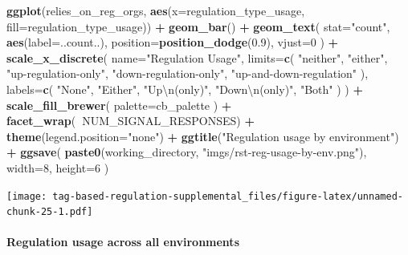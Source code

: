 \documentclass[]{book}
\newenvironment{Shaded}{\begin{snugshade}}{\end{snugshade}}
\newcommand{\CharTok}[1]{\textcolor[rgb]{0.31,0.60,0.02}{#1}}
\newcommand{\DataTypeTok}[1]{\textcolor[rgb]{0.13,0.29,0.53}{#1}}
\newcommand{\DecValTok}[1]{\textcolor[rgb]{0.00,0.00,0.81}{#1}}
\newcommand{\FloatTok}[1]{\textcolor[rgb]{0.00,0.00,0.81}{#1}}
\newcommand{\KeywordTok}[1]{\textcolor[rgb]{0.13,0.29,0.53}{\textbf{#1}}}
\newcommand{\NormalTok}[1]{#1}
\newcommand{\OperatorTok}[1]{\textcolor[rgb]{0.81,0.36,0.00}{\textbf{#1}}}
\newcommand{\StringTok}[1]{\textcolor[rgb]{0.31,0.60,0.02}{#1}}
\let\oldparagraph\paragraph
\renewcommand{\paragraph}[1]{\oldparagraph{#1}\mbox{}}
\begin{document}
\begin{Shaded}
\begin{Highlighting}[]
\KeywordTok{ggplot}\NormalTok{(relies_on_reg_orgs, }\KeywordTok{aes}\NormalTok{(}\DataTypeTok{x=}\NormalTok{regulation_type_usage, }\DataTypeTok{fill=}\NormalTok{regulation_type_usage)) }\OperatorTok{+}
\StringTok{  }\KeywordTok{geom_bar}\NormalTok{() }\OperatorTok{+}
\StringTok{  }\KeywordTok{geom_text}\NormalTok{(}
    \DataTypeTok{stat=}\StringTok{"count"}\NormalTok{,}
    \KeywordTok{aes}\NormalTok{(}\DataTypeTok{label=}\NormalTok{..count..),}
    \DataTypeTok{position=}\KeywordTok{position_dodge}\NormalTok{(}\FloatTok{0.9}\NormalTok{),}
    \DataTypeTok{vjust=}\DecValTok{0}
\NormalTok{  ) }\OperatorTok{+}
\StringTok{  }\KeywordTok{scale_x_discrete}\NormalTok{(}
    \DataTypeTok{name=}\StringTok{"Regulation Usage"}\NormalTok{,}
    \DataTypeTok{limits=}\KeywordTok{c}\NormalTok{(}
      \StringTok{"neither"}\NormalTok{,}
      \StringTok{"either"}\NormalTok{,}
      \StringTok{"up-regulation-only"}\NormalTok{,}
      \StringTok{"down-regulation-only"}\NormalTok{,}
      \StringTok{"up-and-down-regulation"}
\NormalTok{    ),}
    \DataTypeTok{labels=}\KeywordTok{c}\NormalTok{(}
      \StringTok{"None"}\NormalTok{,}
      \StringTok{"Either"}\NormalTok{,}
      \StringTok{"Up}\CharTok{\textbackslash{}n}\StringTok{(only)"}\NormalTok{,}
      \StringTok{"Down}\CharTok{\textbackslash{}n}\StringTok{(only)"}\NormalTok{,}
      \StringTok{"Both"}
\NormalTok{    )}
\NormalTok{  ) }\OperatorTok{+}
\StringTok{  }\KeywordTok{scale_fill_brewer}\NormalTok{(}
    \DataTypeTok{palette=}\NormalTok{cb_palette}
\NormalTok{  ) }\OperatorTok{+}
\StringTok{  }\KeywordTok{facet_wrap}\NormalTok{(}\OperatorTok{~}\NormalTok{NUM_SIGNAL_RESPONSES) }\OperatorTok{+}
\StringTok{  }\KeywordTok{theme}\NormalTok{(}\DataTypeTok{legend.position=}\StringTok{"none"}\NormalTok{) }\OperatorTok{+}
\StringTok{  }\KeywordTok{ggtitle}\NormalTok{(}\StringTok{"Regulation usage by environment"}\NormalTok{) }\OperatorTok{+}
\StringTok{  }\KeywordTok{ggsave}\NormalTok{(}
    \KeywordTok{paste0}\NormalTok{(working_directory, }\StringTok{"imgs/rst-reg-usage-by-env.png"}\NormalTok{),}
    \DataTypeTok{width=}\DecValTok{8}\NormalTok{,}
    \DataTypeTok{height=}\DecValTok{6}
\NormalTok{  )}
\end{Highlighting}
\end{Shaded}

\texttt{[image: tag-based-regulation-supplemental\_files/figure-latex/unnamed-chunk-25-1.pdf]}

\hypertarget{regulation-usage-across-all-environments}{%
\paragraph{Regulation usage across all environments}\label{regulation-usage-across-all-environments}}
\end{document}
